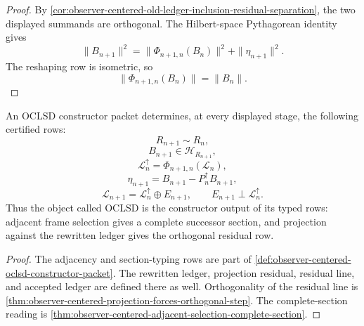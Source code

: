 \begin{proof}
By
\autoref{cor:observer-centered-old-ledger-inclusion-residual-separation},
the two displayed summands are orthogonal. The Hilbert-space
Pythagorean identity gives
$$
\|B_{n+1}\|^2
=
\|\Phi_{n+1,n}(B_n)\|^2+\|\eta_{n+1}\|^2.
$$
The reshaping row is isometric, so
$$
\|\Phi_{n+1,n}(B_n)\|=\|B_n\|.
$$
\end{proof}

\begin{theorem}
\label{thm:observer-centered-constructor-certificate}
An OCLSD constructor packet determines, at every displayed stage, the
following certified rows:
$$
R_{n+1}\sim R_n,
$$
$$
B_{n+1}\in\mathcal H_{R_{n+1}},
$$
$$
\mathcal L_n^{\uparrow}
=
\Phi_{n+1,n}(\mathcal L_n),
$$
$$
\eta_{n+1}
=
B_{n+1}-P_n^{\uparrow}B_{n+1},
$$
$$
\mathcal L_{n+1}
=
\mathcal L_n^{\uparrow}\oplus E_{n+1},
\qquad
E_{n+1}\perp\mathcal L_n^{\uparrow}.
$$
Thus the object called OCLSD is the constructor output of its typed
rows: adjacent frame selection gives a complete successor section, and
projection against the rewritten ledger gives the orthogonal residual
row.
\end{theorem}

\begin{proof}
The adjacency and section-typing rows are part of
\autoref{def:observer-centered-oclsd-constructor-packet}. The rewritten
ledger, projection residual, residual line, and accepted ledger are
defined there as well. Orthogonality of the residual line is
\autoref{thm:observer-centered-projection-forces-orthogonal-step}. The
complete-section reading is
\autoref{thm:observer-centered-adjacent-selection-complete-section}.
\end{proof}
